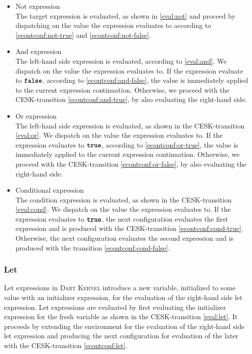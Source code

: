 \documentclass[a4paper,oneside,fleqn]{article}
\newcommand{\kernel}{\textsc{Dart Kernel}}
\newcommand{\synt}[1]{\ensuremath{\text{\textbf{\texttt{#1}}}}}
\newcommand{\true}{\synt{true}}
\newcommand{\false}{\synt{false}}
\begin{document}
\begin{itemize}
    \item Not expression\\
        The target expression is evaluated, as shown in \eqref{eval:not} and proceed by dispatching on the value the expression evaluates to according to \eqref{econtconf:not-true} and \eqref{econtconf:not-false}.

    \item And expression\\
        The left-hand side expression is evaluated, according to \eqref{eval:and}.
        We dispatch on the value the expression evaluates to.
        If the expression evaluate to $\false$, according to \eqref{econtconf:and-false}, the value is immediately applied to the current expression continuation.
        Otherwise, we proceed with the CESK-transition \eqref{econtconf:and-true}, by also evaluating the right-hand side.

    \item Or expression\\
        The left-hand side expression is evaluated, as shown in the CESK-transition \eqref{eval:or}.
        We dispatch on the value the expression evaluates to.
        If the expression evaluates to $\true$, according to \eqref{econtconf:or-true}, the value is immediately applied to the current expression continuation.
        Otherwise, we proceed with the CESK-transition \eqref{econtconf:or-false}, by also evaluating the right-hand side.

    \item Conditional expression\\
        The condition expression is evaluated, as shown in the CESK-transition \eqref{eval:cond}.
        We dispatch on the value the expression evaluates to.
        If the expression evaluates to $\true$, the next configuration evaluates the first expression and is produced with the CESK-transition \eqref{econtconf:cond-true}.
        Otherwise, the next configuration evaluates the second expression and is produced with the transition \eqref{econtconf:cond-false}.

\end{itemize}


\subsubsection{Let}

Let expressions in \kernel{} introduce a new variable, initialized to some value with an initializer expression, for the evaluation of the right-hand side let expression.
Let expressions are evaluated by first evaluating the initializer expression for the fresh variable as shown in the CESK-transition \eqref{eval:let}.
It proceeds by extending the environment for the evaluation of the right-hand side let expression and producing the next configuration for evaluation of the later with the CESK-transition \eqref{econtconf:let}.
\end{document}
